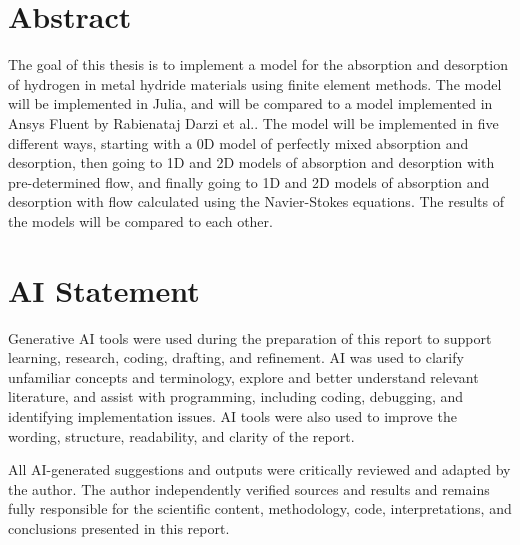 \section*{Abstract}
The goal of this thesis is to implement a model for the absorption and desorption of hydrogen in metal hydride materials using finite element methods. The model will be implemented in Julia, and will be compared to a model implemented in Ansys Fluent by Rabienataj Darzi et al.\cite{RabienatajDarzi2016}. The model will be implemented in five different ways, starting with a 0D model of perfectly mixed absorption and desorption, then going to 1D and 2D models of absorption and desorption with pre-determined flow, and finally going to 1D and 2D models of absorption and desorption with flow calculated using the Navier-Stokes equations. The results of the models will be compared to each other.

\newpage

\section*{AI Statement}
Generative AI tools were used during the preparation of this report to support learning, research, coding, drafting, and refinement. AI was used to clarify unfamiliar concepts and terminology, explore and better understand relevant literature, and assist with programming, including coding, debugging, and identifying implementation issues. AI tools were also used to improve the wording, structure, readability, and clarity of the report.

All AI-generated suggestions and outputs were critically reviewed and adapted by the author. The author independently verified sources and results and remains fully responsible for the scientific content, methodology, code, interpretations, and conclusions presented in this report.

\newpage